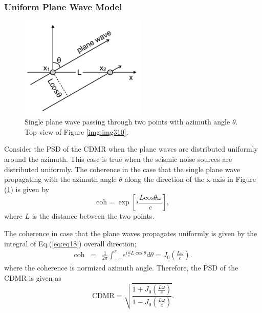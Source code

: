 \subsubsection{Uniform Plane Wave Model}
\begin{figure}[h]
  \begin{center}
    \includegraphics[width=6.0cm]{./img_chap3/img304.png}
    \caption{Single plane wave passing through two points with azimuth angle $\theta$. Top view of Figure {\ref{img:img310}}.}\label{img:img304}
  \end{center}
\end{figure}

Consider the PSD of the CDMR when the plane waves are distributed uniformly around the azimuth. This case is true when the seismic noise sources are distributed uniformly. The coherence in the case that the single plane wave propagating with the azimuth angle $\theta$ along the direction of the x-axis in Figure (\ref{img:img304}) is given by
\begin{equation}
  \mathrm{coh} = \exp\left[{i\frac{L\mathrm{cos}\theta\omega}{c}}\right], \label{eq:eq18}
\end{equation}
where $L$ is the distance between the two points.

The coherence in case that the plane waves propagates uniformly is given by the integral of Eq.(\ref{eq:eq18}) overall direction;
\begin{eqnarray} \label{eq:eq19}
  \mathrm{coh} &=& \frac{1}{2\pi} \int_{-\pi}^{\pi} e^{i\frac{\omega}{c} L\cos \theta} d \theta = J_0\left(\frac{L\omega}{c}\right).
\end{eqnarray}
where the coherence is normized azimuth angle. Therefore, the PSD of the CDMR is given as
\begin{equation}  \label{eq:eq20}
  \mathrm{CDMR} = \sqrt{\frac{1+J_0(\frac{L\omega}{c})}{1-J_0(\frac{L\omega}{c})}} .
\end{equation}

